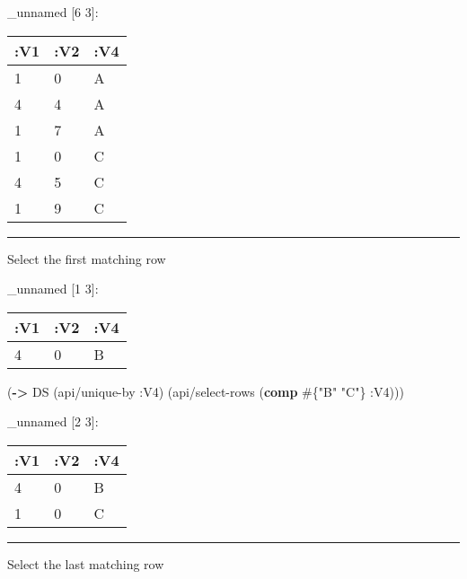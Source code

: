 \documentclass[]{article}
\newenvironment{Shaded}{\begin{snugshade}}{\end{snugshade}}
\newcommand{\KeywordTok}[1]{\textcolor[rgb]{0.13,0.29,0.53}{\textbf{#1}}}
\newcommand{\StringTok}[1]{\textcolor[rgb]{0.31,0.60,0.02}{#1}}
\newcommand{\VariableTok}[1]{\textcolor[rgb]{0.00,0.00,0.00}{#1}}
\newcommand{\AttributeTok}[1]{\textcolor[rgb]{0.77,0.63,0.00}{#1}}
\newcommand{\NormalTok}[1]{#1}
\begin{document}
\_unnamed {[}6 3{]}:

\begin{longtable}[]{@{}lll@{}}
\toprule
:V1 & :V2 & :V4\tabularnewline
\midrule
\endhead
1 & 0 & A\tabularnewline
4 & 4 & A\tabularnewline
1 & 7 & A\tabularnewline
1 & 0 & C\tabularnewline
4 & 5 & C\tabularnewline
1 & 9 & C\tabularnewline
\bottomrule
\end{longtable}

\begin{center}\rule{0.5\linewidth}{0.5pt}\end{center}

Select the first matching row

\begin{Shaded}
\end{Shaded}

\_unnamed {[}1 3{]}:

\begin{longtable}[]{@{}lll@{}}
\toprule
:V1 & :V2 & :V4\tabularnewline
\midrule
\endhead
4 & 0 & B\tabularnewline
\bottomrule
\end{longtable}

\begin{Shaded}
\begin{Highlighting}[]
\NormalTok{(}\KeywordTok{->}\NormalTok{ DS}
\NormalTok{    (api/unique-by }\AttributeTok{:V4}\NormalTok{)}
\NormalTok{    (api/select-rows (}\KeywordTok{comp}\NormalTok{ #\{}\StringTok{"B"} \StringTok{"C"}\NormalTok{\} }\AttributeTok{:V4}\NormalTok{)))}
\end{Highlighting}
\end{Shaded}

\_unnamed {[}2 3{]}:

\begin{longtable}[]{@{}lll@{}}
\toprule
:V1 & :V2 & :V4\tabularnewline
\midrule
\endhead
4 & 0 & B\tabularnewline
1 & 0 & C\tabularnewline
\bottomrule
\end{longtable}

\begin{center}\rule{0.5\linewidth}{0.5pt}\end{center}

Select the last matching row
\end{document}
